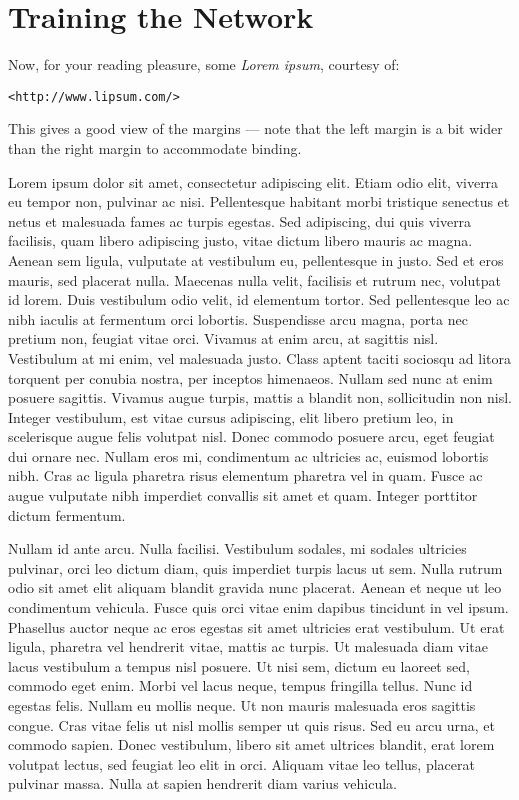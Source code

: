 

\chapter{Training the Network}\label{chap:training}

Now, for your reading pleasure, some \textsl{Lorem ipsum}, courtesy
of:
\begin{center}
\texttt{<http://www.lipsum.com/>}
\end{center}
This gives a good view of the margins --- note that the left margin
is a bit wider than the right margin to accommodate binding.

Lorem ipsum dolor sit amet, consectetur adipiscing elit. Etiam odio elit,
viverra eu tempor non, pulvinar ac nisi. Pellentesque habitant morbi
tristique senectus et netus et malesuada fames ac turpis egestas. Sed
adipiscing, dui quis viverra facilisis, quam libero adipiscing justo,
vitae dictum libero mauris ac magna. Aenean sem ligula, vulputate at
vestibulum eu, pellentesque in justo. Sed et eros mauris, sed placerat
nulla. Maecenas nulla velit, facilisis et rutrum nec, volutpat id
lorem. Duis vestibulum odio velit, id elementum tortor. Sed pellentesque
leo ac nibh iaculis at fermentum orci lobortis. Suspendisse arcu magna,
porta nec pretium non, feugiat vitae orci. Vivamus at enim arcu,
at sagittis nisl. Vestibulum at mi enim, vel malesuada justo. Class
aptent taciti sociosqu ad litora torquent per conubia nostra, per
inceptos himenaeos. Nullam sed nunc at enim posuere sagittis. Vivamus
augue turpis, mattis a blandit non, sollicitudin non nisl. Integer
vestibulum, est vitae cursus adipiscing, elit libero pretium leo,
in scelerisque augue felis volutpat nisl. Donec commodo posuere arcu,
eget feugiat dui ornare nec. Nullam eros mi, condimentum ac ultricies ac,
euismod lobortis nibh. Cras ac ligula pharetra risus elementum pharetra
vel in quam. Fusce ac augue vulputate nibh imperdiet convallis sit amet
et quam. Integer porttitor dictum fermentum.

Nullam id ante arcu. Nulla facilisi. Vestibulum sodales, mi sodales
ultricies pulvinar, orci leo dictum diam, quis imperdiet turpis lacus
ut sem. Nulla rutrum odio sit amet elit aliquam blandit gravida nunc
placerat. Aenean et neque ut leo condimentum vehicula. Fusce quis orci
vitae enim dapibus tincidunt in vel ipsum. Phasellus auctor neque ac eros
egestas sit amet ultricies erat vestibulum. Ut erat ligula, pharetra
vel hendrerit vitae, mattis ac turpis. Ut malesuada diam vitae lacus
vestibulum a tempus nisl posuere. Ut nisi sem, dictum eu laoreet sed,
commodo eget enim. Morbi vel lacus neque, tempus fringilla tellus. Nunc
id egestas felis. Nullam eu mollis neque. Ut non mauris malesuada
eros sagittis congue. Cras vitae felis ut nisl mollis semper ut quis
risus. Sed eu arcu urna, et commodo sapien. Donec vestibulum, libero
sit amet ultrices blandit, erat lorem volutpat lectus, sed feugiat leo
elit in orci. Aliquam vitae leo tellus, placerat pulvinar massa. Nulla
at sapien hendrerit diam varius vehicula.

